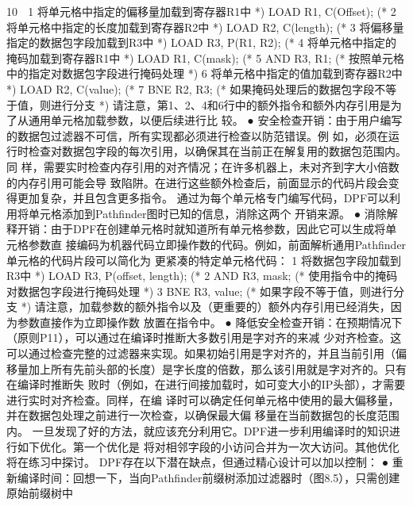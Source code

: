                                                         10
 1                        将单元格中指定的偏移量加载到寄存器R1中 *)
     LOAD R1, C(Offset); (*
 2                        将单元格中指定的长度加载到寄存器R2中 *)
     LOAD R2, C(length); (*
 3                        将偏移量指定的数据包字段加载到R3中 *)
     LOAD R3, P(R1, R2); (*
 4                      将单元格中指定的掩码加载到寄存器R1中 *)
     LOAD R1, C(mask); (*
 5   AND R3, R1; (* 按照单元格中的指定对数据包字段进行掩码处理 *)
 6                       将单元格中指定的值加载到寄存器R2中 *)
     LOAD R2, C(value); (*
 7   BNE R2, R3; (* 如果掩码处理后的数据包字段不等于值，则进行分支 *)
请注意，第1、2、4和6行中的额外指令和额外内存引用是为了从通用单元格加载参数，以便后续进行比
较。
 ● 安全检查开销：由于用户编写的数据包过滤器不可信，所有实现都必须进行检查以防范错误。例
   如，必须在运行时检查对数据包字段的每次引用，以确保其在当前正在解复用的数据包范围内。同
   样，需要实时检查内存引用的对齐情况；在许多机器上，未对齐到字大小倍数的内存引用可能会导
   致陷阱。在进行这些额外检查后，前面显示的代码片段会变得更加复杂，并且包含更多指令。
通过为每个单元格专门编写代码，DPF可以利用将单元格添加到Pathfinder图时已知的信息，消除这两个
开销来源。
 ● 消除解释开销：由于DPF在创建单元格时就知道所有单元格参数，因此它可以生成将单元格参数直
   接编码为机器代码立即操作数的代码。例如，前面解析通用Pathfinder单元格的代码片段可以简化为
   更紧凑的特定单元格代码：
 1                             将数据包字段加载到R3中 *)
     LOAD R3, P(offset, length); (*
 2   AND R3, mask; (* 使用指令中的掩码对数据包字段进行掩码处理 *)
 3   BNE R3, value; (* 如果字段不等于值，则进行分支 *)
请注意，加载参数的额外指令以及（更重要的）额外内存引用已经消失，因为参数直接作为立即操作数
放置在指令中。
 ● 降低安全检查开销：在预期情况下（原则P11），可以通过在编译时推断大多数引用是字对齐的来减
   少对齐检查。这可以通过检查完整的过滤器来实现。如果初始引用是字对齐的，并且当前引用（偏
   移量加上所有先前头部的长度）是字长度的倍数，那么该引用就是字对齐的。只有在编译时推断失
   败时（例如，在进行间接加载时，如可变大小的IP头部），才需要进行实时对齐检查。同样，在编
   译时可以确定任何单元格中使用的最大偏移量，并在数据包处理之前进行一次检查，以确保最大偏
   移量在当前数据包的长度范围内。
一旦发现了好的方法，就应该充分利用它。DPF进一步利用编译时的知识进行如下优化。第一个优化是
将对相邻字段的小访问合并为一次大访问。其他优化将在练习中探讨。
DPF存在以下潜在缺点，但通过精心设计可以加以控制：
 ● 重新编译时间：回想一下，当向Pathfinder前缀树添加过滤器时（图8.5），只需创建原始前缀树中



